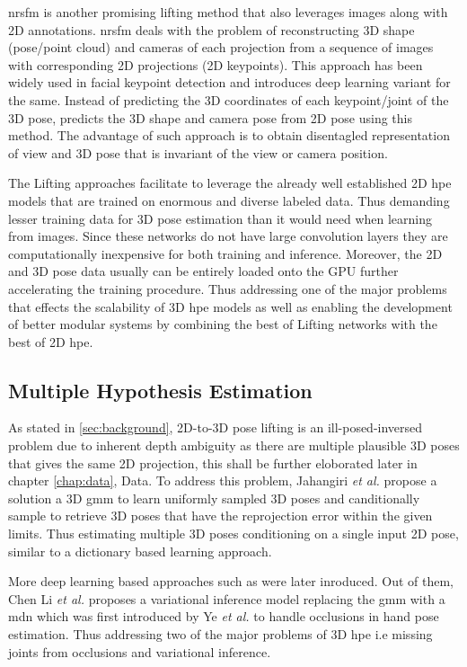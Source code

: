 \ac{nrsfm} is another promising lifting method that also leverages images along with 2D annotations. \ac{nrsfm} deals with the problem of reconstructing 3D shape (pose/point cloud) and cameras of each projection from a sequence of images with corresponding 2D projections (2D keypoints). This approach has been widely used in facial keypoint detection and \cite{deepNRSFM} introduces deep learning variant for the same. Instead of predicting the 3D coordinates of each keypoint/joint of the 3D pose, \cite{DistillNRSfM, c3dpo, deepNRSFM, nrsfm++} predicts the 3D shape and camera pose from 2D pose using this method. The advantage of such approach is to obtain disentagled representation of view and 3D pose that is invariant of the view or camera position.

The Lifting approaches facilitate to leverage the already well established 2D \ac{hpe} models that are trained on enormous and diverse labeled data. Thus demanding lesser training data for 3D pose estimation than it would need when learning from images. Since these networks do not have large convolution layers they are computationally inexpensive for both training and inference. Moreover, the 2D and 3D pose data usually can be entirely loaded onto the GPU further accelerating the training procedure. Thus addressing one of the major problems that effects the scalability of 3D \ac{hpe} models as well as enabling the development of better modular systems by combining the best of Lifting networks with the best of 2D \ac{hpe}.

\subsection{Multiple Hypothesis Estimation}
\label{subsec:multiple_hypothesis_estimation}

As stated in \ref{sec:background}, 2D-to-3D pose lifting is an ill-posed-inversed problem due to inherent depth ambiguity as there are multiple plausible 3D poses that gives the same 2D projection, this shall be further eloborated later in chapter \ref{chap:data}, Data. To address this problem, Jahangiri \textit{et al.} \cite{jahangiri} propose a solution a 3D \ac{gmm} to learn uniformly sampled 3D poses and canditionally sample to retrieve 3D poses that have the reprojection error within the given limits. Thus estimating multiple 3D poses conditioning on a single input 2D pose, similar to a dictionary based learning approach. 

More deep learning based approaches such as \cite{weaklymultiple,multiplehypo,ordinalranking} were later inroduced. Out of them, Chen Li \textit{et al.} \cite{multiplehypo} proposes a variational inference model replacing the \ac{gmm} with a \ac{mdn} which was first introduced by Ye \textit{et al.} \cite{mixturedensitymodel} to handle occlusions in hand pose estimation. Thus addressing two of the major problems of 3D \ac{hpe} i.e missing joints from occlusions and variational inference. 

